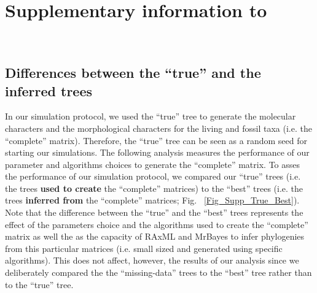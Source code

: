 %
%

\chapter{Supplementary information to }
\label{chap:Appendix_TEM_paper}

\bigskip
\medskip
\begin{center}

 \\
\bigskip
\end{center}

\section{Differences between the ``true'' and the inferred trees}

In our simulation protocol, we used the ``true'' tree to generate the molecular characters and the morphological characters for the living and fossil taxa (i.e. the ``complete'' matrix).
Therefore, the ``true'' tree can be seen as a random seed for starting our simulations.
The following analysis measures the performance of our parameter and algorithms choices to generate the ``complete'' matrix.
To asses the performance of our simulation protocol, we compared our ``true'' trees (i.e. the trees \textbf{used to create} the ``complete'' matrices) to the ``best'' trees (i.e. the trees \textbf{inferred from} the ``complete'' matrices; Fig. ~\ref{Fig_Supp_True_Best}).
Note that the difference between the ``true'' and the ``best'' trees represents the effect of the parameters choice and the algorithms used to create the ``complete'' matrix as well the as the capacity of RAxML and MrBayes to infer phylogenies from this particular matrices (i.e. small sized and generated using specific algorithms).
This does not affect, however, the results of our analysis since we deliberately compared the the ``missing-data'' trees to the ``best'' tree rather than to the ``true'' tree. 


